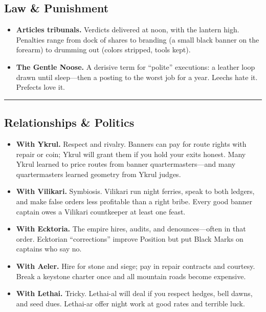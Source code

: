 \documentclass[11pt]{article}
\begin{document}
\subsection*{Law \& Punishment}

\begin{itemize}
    \item \textbf{Articles tribunals.} Verdicts delivered at noon, with the lantern high. Penalties range from dock of shares to branding (a small black banner on the forearm) to drumming out (colors stripped, tools kept).
    
    \item \textbf{The Gentle Noose.} A derisive term for ``polite'' executions: a leather loop drawn until sleep---then a posting to the worst job for a year. Leechs hate it. Prefects love it.
\end{itemize}

\rule{\textwidth}{0.4pt}

\subsection*{Relationships \& Politics}

\begin{itemize}
    \item \textbf{With Ykrul.} Respect and rivalry. Banners can pay for route rights with repair or coin; Ykrul will grant them if you hold your exits honest. Many Ykrul learned to price routes from banner quartermasters---and many quartermasters learned geometry from Ykrul judges.
    
    \item \textbf{With Vilikari.} Symbiosis. Vilikari run night ferries, speak to both ledgers, and make false orders less profitable than a right bribe. Every good banner captain owes a Vilikari countkeeper at least one feast.
    
    \item \textbf{With Ecktoria.} The empire hires, audits, and denounces---often in that order. Ecktorian ``corrections'' improve Position but put Black Marks on captains who say no.
    
    \item \textbf{With Aeler.} Hire for stone and siege; pay in repair contracts and courtesy. Break a keystone charter once and all mountain roads become expensive.
    
    \item \textbf{With Lethai.} Tricky. Lethai-al will deal if you respect hedges, bell dawns, and seed dues. Lethai-ar offer night work at good rates and terrible luck.
\end{itemize}
\end{document}
